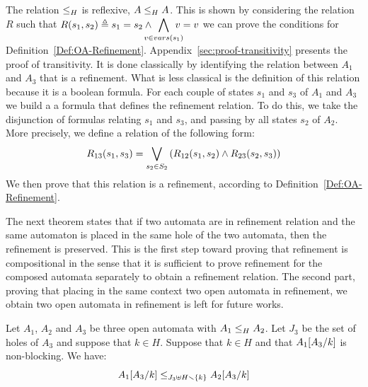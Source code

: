 \documentclass[runningheads]{llncs}
\begin{document}
\begin{proofsketch}
The relation  \(\wrel{}{}{H}\) is reflexive,  \(\wrel{A}{A}{H}\). This is shown  by considering the relation $R$ such that $R\mpar{s_1, s_2} \triangleq s_1=s_2\land \displaystyle\bigwedge_\subbox{v \in vars(s_1)} {v=v}$   we can prove the conditions for Definition~\ref{Def:OA-Refinement}.
%
Appendix~\ref{sec:proof-transitivity} presents the proof of transitivity. It is done classically by identifying the relation between $A_1$ and $A_3$ that is a refinement. What is less classical is the definition of this relation because it is a boolean formula. For each couple of states  $s_1$ and $s_3$ of $A_1$ and $A_3$ we build a a formula that defines the refinement relation. To do this, we take the disjunction of formulas relating $s_1$ and $s_3$, and passing by all states $s_2$ of $A_2$. More precisely, we define a relation of the following form:
  \[R_{13}(s_1,s_3)=\bigvee_{s_2\in S_2}\mpar{R_{12}(s_1,s_2) \land R_{23}(s_2,s_3) } \]
We then prove that this relation  is a refinement, according to Definition~\ref{Def:OA-Refinement}.

\end{proofsketch}

The next  theorem states that if two automata are in refinement relation and the same automaton is placed in the same hole of the two automata, then the refinement is preserved. This is the first step toward proving that
 refinement is compositional in the sense that it is sufficient to prove refinement for the composed automata separately to obtain a refinement relation.
The second part,  proving that placing in the same context two open automata in refinement, we obtain two open automata in refinement is left for future works.
%
%



\begin{theorem}\label{thm:ContextRefinement}
Let $A_1$, $A_2$ and $A_3$ be three open automata with $\wrel{A_1}{A_2}{H}$. 
Let $J_3$ be the set of holes of $A_3$ and suppose that $k \in H$.
Suppose that \(k \in H\) and that \(A_1\subst{A_3}{k}\) is non-blocking.
We have: \[\wrel{A_1\subst{A_3}{k}}{A_2\subst{A_3}{k}}{J_3 \uplus H \setminus \mbrc{k}}\]
\end{theorem}
\end{document}
